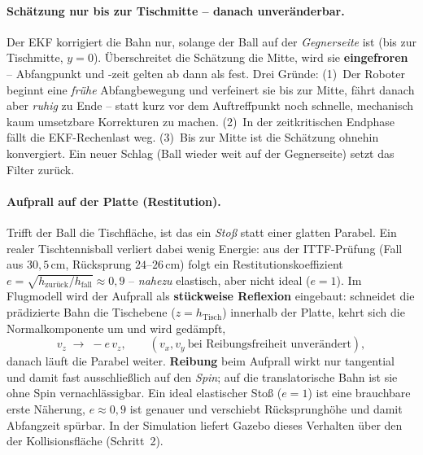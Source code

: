 \paragraph{Schätzung nur bis zur Tischmitte -- danach unveränderbar.} Der EKF
korrigiert die Bahn nur, solange der Ball auf der \emph{Gegnerseite} ist
(bis zur Tischmitte, $y=0$). Überschreitet die Schätzung die Mitte, wird sie
\textbf{eingefroren} -- Abfangpunkt und -zeit gelten ab dann als fest. Drei
Gründe: (1)~Der Roboter beginnt eine \emph{frühe} Abfangbewegung und verfeinert
sie bis zur Mitte, fährt danach aber \emph{ruhig} zu Ende -- statt kurz vor dem
Auftreffpunkt noch schnelle, mechanisch kaum umsetzbare Korrekturen zu machen.
(2)~In der zeitkritischen Endphase fällt die EKF-Rechenlast weg. (3)~Bis zur
Mitte ist die Schätzung ohnehin konvergiert. Ein neuer Schlag (Ball wieder weit
auf der Gegnerseite) setzt das Filter zurück.

\paragraph{Aufprall auf der Platte (Restitution).} Trifft der Ball die
Tischfläche, ist das ein \emph{Stoß} statt einer glatten Parabel. Ein realer
Tischtennisball verliert dabei wenig Energie: aus der ITTF-Prüfung (Fall aus
$30{,}5\,$cm, Rücksprung $24$--$26\,$cm) folgt ein Restitutionskoeffizient
$e=\sqrt{h_{\text{zurück}}/h_{\text{fall}}}\approx0{,}9$ -- \emph{nahezu}
elastisch, aber nicht ideal ($e=1$). Im Flugmodell wird der Aufprall als
\textbf{stückweise Reflexion} eingebaut: schneidet die prädizierte Bahn die
Tischebene ($z=h_{\text{Tisch}}$) innerhalb der Platte, kehrt sich die
Normalkomponente um und wird gedämpft,
\begin{equation}
v_z \;\rightarrow\; -e\,v_z,\qquad (v_x,v_y\ \text{bei Reibungsfreiheit unverändert}),
\end{equation}
danach läuft die Parabel weiter. \textbf{Reibung} beim Aufprall wirkt nur
tangential und damit fast ausschließlich auf den \emph{Spin}; auf die
translatorische Bahn ist sie ohne Spin vernachlässigbar. Ein ideal elastischer
Stoß ($e=1$) ist eine brauchbare erste Näherung, $e\approx0{,}9$ ist genauer und
verschiebt Rücksprunghöhe und damit Abfangzeit spürbar. In der Simulation liefert
Gazebo dieses Verhalten über den  der
Kollisionsfläche (Schritt~2).

